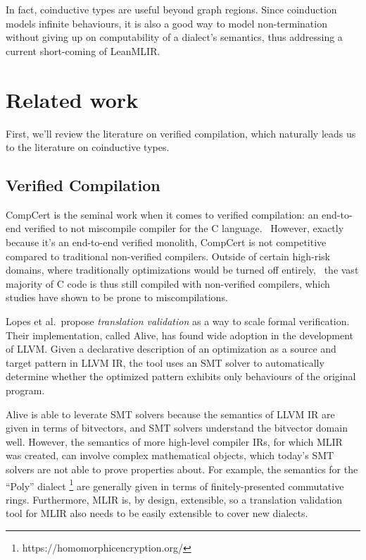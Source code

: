 \documentclass[a4paper]{scrartcl}
\begin{document}
In fact, coinductive types are useful beyond graph regions. Since
coinduction models infinite behaviours, it is also a good way to model
non-termination without giving up on computability of a dialect's
semantics, thus addressing a current short-coming of LeanMLIR.



\section{Related work}\label{related-work}

First, we'll review the literature on verified compilation, which
naturally leads us to the literature on coinductive types.

\subsection{Verified Compilation}\label{verified-compilation}

CompCert is the
seminal work when it comes to verified compilation: an end-to-end
verified to not miscompile compiler for the C language.~\cite{leroyCompCertFormallyVerified}
However, exactly
because it's an end-to-end verified monolith, CompCert is not
competitive compared to traditional non-verified compilers. Outside of
certain high-risk domains, where traditionally optimizations would be
turned off entirely,~\cite{kastnerCompCertPracticalExperience} the
vast majority of C code is thus still compiled with non-verified
compilers, which studies have shown to be prone to miscompilations.~\cite{yangFindingUnderstandingBugs2011}

Lopes et al.~propose \emph{translation validation} as a way to scale
formal verification.~\cite{lopesAlive2BoundedTranslation2021}
Their implementation, called Alive, has found wide adoption in the
development of LLVM. Given a declarative description of an optimization
as a source and target pattern in LLVM IR, the tool uses an SMT solver
to automatically determine whether the optimized pattern exhibits only
behaviours of the original program.

Alive is able to leverate SMT solvers because the semantics of LLVM IR
are given in terms of bitvectors, and SMT solvers understand the
bitvector domain well. However, the semantics of more high-level
compiler IRs, for which MLIR was created, can involve complex
mathematical objects, which today's SMT solvers are not able to prove
properties about. For example, the semantics for the ``Poly'' dialect
\footnote{https://homomorphicencryption.org/} are generally given in
terms of finitely-presented commutative rings. Furthermore, MLIR is, by
design, extensible, so a translation validation tool for MLIR also needs
to be easily extensible to cover new dialects.
\end{document}
